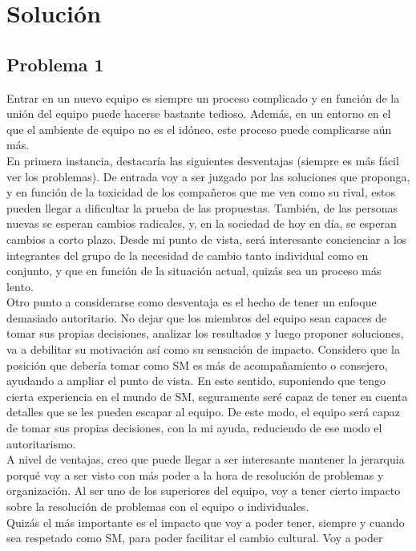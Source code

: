\documentclass[a4paper, 11pt, oneside]{article}
\begin{document}
\section{Solución}
\subsection{Problema 1}
Entrar en un nuevo equipo es siempre un proceso complicado y en función de la
unión del equipo puede hacerse bastante tedioso. Además, en un entorno en el que
el ambiente de equipo no es el idóneo, este proceso puede complicarse aún más.
\\[8pt]
En primera instancia, destacaría las siguientes desventajas (siempre es más
fácil ver los problemas). De entrada voy a ser juzgado por las soluciones que
proponga, y en función de la toxicidad de los compañeros que me ven como su
rival, estos pueden llegar a dificultar la prueba de las propuestas. También, de
las personas nuevas se esperan cambios radicales, y, en la sociedad de hoy en
día, se esperan cambios a corto plazo. Desde mi punto de vista, será interesante
concienciar a los integrantes del grupo de la necesidad de cambio tanto
individual como en conjunto, y que en función de la situación actual, quizás sea
un proceso más lento.
\\
Otro punto a considerarse como desventaja es el hecho de tener un enfoque
demasiado autoritario. No dejar que los miembros del equipo sean capaces de
tomar sus propias decisiones, analizar los resultados y luego proponer
soluciones, va a debilitar su motivación así como su sensación de impacto.
Considero que la posición que debería tomar como SM es más de acompañamiento o
consejero, ayudando a ampliar el punto de vista. En este sentido, suponiendo que
tengo cierta experiencia en el mundo de SM, seguramente seré capaz de tener en
cuenta detalles que se les pueden escapar al equipo. De este modo, el equipo
será capaz de tomar sus propias decisiones, con la mi ayuda, reduciendo de ese
modo el autoritarismo.
\\[8pt]
A nivel de ventajas, creo que puede llegar a ser interesante mantener la
jerarquia porqué voy a ser visto con más poder a la hora de resolución de
problemas y organización. Al ser uno de los superiores del equipo, voy a tener
cierto impacto sobre la resolución de problemas con el equipo o individuales.
\\
Quizás el más importante es el impacto que voy a poder tener, siempre y cuando
sea respetado como SM, para poder facilitar el cambio cultural. Voy a poder
\end{document}
